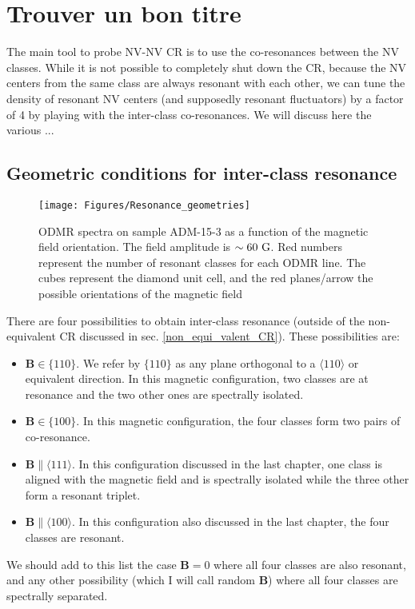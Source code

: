 \documentclass[a4paper,11pt]{report}
\begin{document}
\section{Trouver un bon titre}

The main tool to probe NV-NV CR is to use the co-resonances between the NV classes. While it is not possible to completely shut down the CR, because the NV centers from the same class are always resonant with each other, we can tune the density of resonant NV centers (and supposedly resonant fluctuators) by a factor of 4 by playing with the inter-class co-resonances. We will discuss here the various ...

\subsection{Geometric conditions for inter-class resonance}

\begin{figure}[h]
\centering
\texttt{[image: Figures/Resonance\_geometries]}
\caption{ODMR spectra on sample ADM-15-3 as a function of the magnetic field orientation. The field amplitude is $\sim 60\ \rm G$. Red numbers represent the number of resonant classes for each ODMR line. The cubes represent the diamond unit cell, and the red planes/arrow the possible orientations of the magnetic field}
\label{ODMR_geometries}
\end{figure}

There are four possibilities to obtain inter-class resonance (outside of the non-equivalent CR discussed in sec. \ref{non_equi_valent_CR}). These possibilities are:
\begin{itemize}
\item $\mathbf{B} \in \{110\}$. We refer by $\{110\}$ as any plane orthogonal to a $\langle 110 \rangle$ or equivalent direction. In this magnetic configuration, two classes are at resonance and the two other ones are spectrally isolated.
\item $\mathbf{B} \in \{100\}$. In this magnetic configuration, the four classes form two pairs of co-resonance.
\item $\mathbf{B} \parallel \langle 111 \rangle$. In this configuration discussed in the last chapter, one class is aligned with the magnetic field and is spectrally isolated while the three other form a resonant triplet.
\item $\mathbf{B} \parallel \langle 100 \rangle$. In this configuration also discussed in the last chapter, the four classes are resonant.
\end{itemize}
We should add to this list the case $\mathbf{B}=0$ where all four classes are also resonant, and any other possibility (which I will call random $\mathbf{B}$) where all four classes are spectrally separated. 
\end{document}
